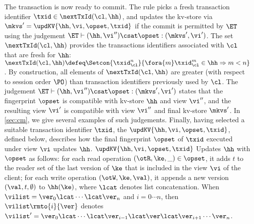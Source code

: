 The transaction is now ready to commit. The rule picks a fresh transaction identifier $\txid \in \nextTxId(\cl, \hh)$, 
and updates the kv-store via $\mkvs' = \updKV{\hh, \vi, \opset, \txid}$
if the commit is permitted by $\ET$ using the judgement $\ET \vdash (\hh, \vi'') \csat \opset : (\mkvs', \vi')$.
The set $\nextTxId(\cl, \hh)$ provides the transactions identifiers
associated with $\cl$ that are fresh for  $\hh$:
$
\nextTxId(\cl, \hh) \defeq \Setcon{\txid_{\cl}^{n}}{\fora{m}
  \txid_{\cl}^{m} \in \hh \Rightarrow m < n }
$.
By construction, all elements of $\nextTxId(\cl, \hh)$ are greater (with respect to session order $\PO$) 
than transaction identifiers previously used by $\cl$. 
The judgement $\ET \vdash (\hh, \vi'') \csat \opset : (\mkvs', \vi')$
states that the fingerprint $\opset$ is compatible with kv-store $\hh$
and view $\vi''$, and the resulting view $\vi'$ 
is compatible with view \( \vi'' \) and final kv-store \( \mkvs' \).
In \cref{sec:cm}, we give several examples of such judgements.
Finally, having selected a suitable transaction identifier $\txid$,
the $\updKV{\hh, \vi, \opset, \txid}$, defined below, describes how the final fingerprint $\opset$ of $\txid$ executed 
under view $\vi$ updates $\hh$.
$\updKV{\hh, \vi, \opset, \txid}$ Updates $\hh$ with $\opset$ as follows: 
for each read operation $(\otR, \ke, \_) \in \opset$, it adds $t$ 
to the reader set of the last version of $\ke$ that is included in the view $\vi$ of the client; 
for each write operation $(\otW, \ke, \val)$, it appends a new version $(\val, t, \emptyset)$ 
to $\hh(\ke)$, where $\lcat$ denotes list concatenation.
When $\vilist = \ver_0 \lcat \cdots \lcat \ver_n$ and $i=0 \cdots n$, 
then $\vilist\rmto{i}{\ver}$ denotes 
$\vilist' = \ver_0 \lcat \cdots \lcat \ver_{i-1} \lcat \ver \lcat \ver_{i+1} \cdots \ver_{n}$. 

